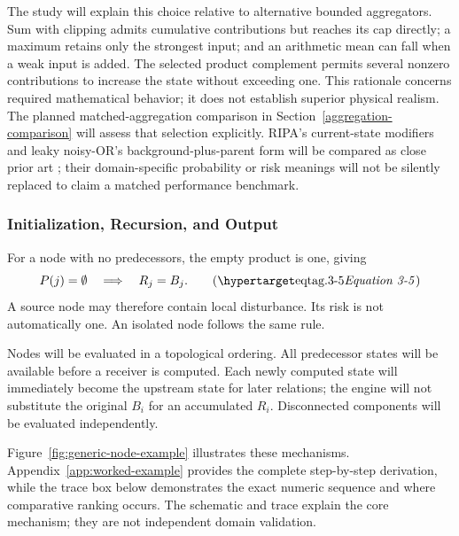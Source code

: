 The study will explain this choice relative to alternative bounded
aggregators. Sum with clipping admits cumulative contributions but reaches
its cap directly; a maximum retains only the strongest input; and an
arithmetic mean can fall when a weak input is added. The selected product
complement permits several nonzero contributions to increase the state
without exceeding one. This rationale concerns required mathematical
behavior; it does not establish superior physical realism. The planned
matched-aggregation comparison in Section~\ref{aggregation-comparison}
will assess that selection explicitly. RIPA's current-state modifiers
and leaky noisy-OR's background-plus-parent form will be compared as
close prior art \citep{faraji2026,fallet2012}; their domain-specific
probability or risk meanings will not be silently replaced to claim
a matched performance benchmark.

\subsubsection{Initialization, Recursion, and Output}

For a node with no predecessors, the empty product is one, giving
\[
P(j)=\emptyset\quad\Longrightarrow\quad R_j=B_j.
\eqtag{3-5}
\]
A source node may therefore contain local disturbance. Its risk is not
automatically one. An isolated node follows the same rule.

Nodes will be evaluated in a topological ordering. All predecessor states
will be available before a receiver is computed. Each newly computed
state will immediately become the upstream state for later relations;
the engine will not substitute the original $B_i$ for an accumulated $R_i$.
Disconnected components will be evaluated independently.

Figure~\ref{fig:generic-node-example} illustrates these mechanisms.
Appendix~\ref{app:worked-example} provides the complete step-by-step
derivation, while the trace box below demonstrates the exact numeric sequence
and where comparative ranking occurs. The schematic and trace explain the
core mechanism; they are not independent domain validation.



